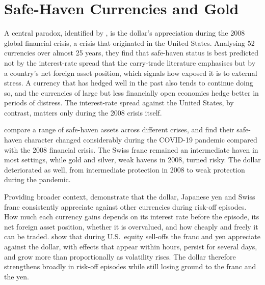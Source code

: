 \section{Safe-Haven Currencies and Gold}
\label{sec:lit_safe_haven}

A central paradox, identified by \textcite{habib_stracca_2012}, is the dollar's appreciation during the 2008 global financial crisis, a crisis that originated in the United States. Analysing 52 currencies over almost 25 years, they find that safe-haven status is best predicted not by the interest-rate spread that the carry-trade literature emphasises but by a country's net foreign asset position, which signals how exposed it is to external stress. A currency that has hedged well in the past also tends to continue doing so, and the currencies of large but less financially open economies hedge better in periods of distress. The interest-rate spread against the United States, by contrast, matters only during the 2008 crisis itself.

\textcite{cheema_faff_szulczyk_2022} compare a range of safe-haven assets across different crises, and find their safe-haven character changed considerably during the COVID-19 pandemic compared with the 2008 financial crisis. The Swiss franc remained an intermediate haven in most settings, while gold and silver, weak havens in 2008, turned risky. The dollar deteriorated as well, from intermediate protection in 2008 to weak protection during the pandemic.

Providing broader context, \textcite{debock_decarvalhofilho_2015} demonstrate that the dollar, Japanese yen and Swiss franc consistently appreciate against other currencies during risk-off episodes. How much each currency gains depends on its interest rate before the episode, its net foreign asset position, whether it is overvalued, and how cheaply and freely it can be traded. \textcite{ranaldo_soderlind_2010} show that during U.S.\ equity sell-offs the franc and yen appreciate against the dollar, with effects that appear within hours, persist for several days, and grow more than proportionally as volatility rises. The dollar therefore strengthens broadly in risk-off episodes while still losing ground to the franc and the yen.


